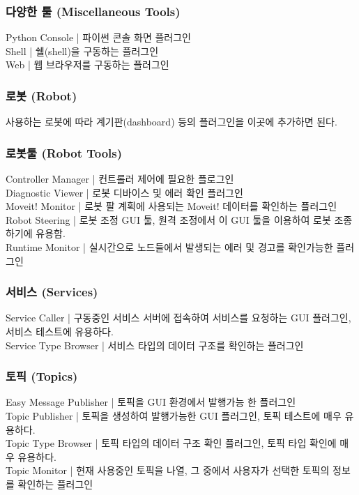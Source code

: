 \subsubsection{다양한 툴 (Miscellaneous Tools)}
Python Console | 파이썬 콘솔 화면 플러그인\\
Shell | 쉘(shell)을 구동하는 플러그인\\
Web | 웹 브라우저를 구동하는 플러그인\\
\subsubsection{로봇 (Robot)}
사용하는 로봇에 따라 계기판(dashboard) 등의 플러그인을 이곳에 추가하면 된다. \\
\subsubsection{로봇툴 (Robot Tools)}
Controller Manager | 컨트롤러 제어에 필요한 플로그인\\
Diagnostic Viewer | 로봇 디바이스 및 에러 확인 플러그인\\
Moveit! Monitor | 로봇 팔 계획에 사용되는 Moveit! 데이터를 확인하는 플러그인\\
Robot Steering | 로봇 조정 GUI 툴, 원격 조정에서 이 GUI 툴을 이용하여 로봇 조종하기에 유용함.\\
Runtime Monitor | 실시간으로 노드들에서 발생되는 에러 및 경고를 확인가능한 플러그인\\
\subsubsection{서비스 (Services)}
Service Caller | 구동중인 서비스 서버에 접속하여 서비스를 요청하는 GUI 플러그인, 서비스 테스트에 유용하다.\\
Service Type Browser | 서비스 타입의 데이터 구조를 확인하는 플러그인\\
\subsubsection{토픽 (Topics)}
Easy Message Publisher | 토픽을 GUI 환경에서 발행가능 한 플러그인\\
Topic Publisher | 토픽을 생성하여 발행가능한 GUI 플러그인, 토픽 테스트에 매우 유용하다.\\
Topic Type Browser | 토픽 타입의 데이터 구조 확인 플러그인, 토픽 타입 확인에 매우 유용하다.\\
Topic Monitor | 현재 사용중인 토픽을 나열, 그 중에서 사용자가 선택한 토픽의 정보를 확인하는 플러그인\\
